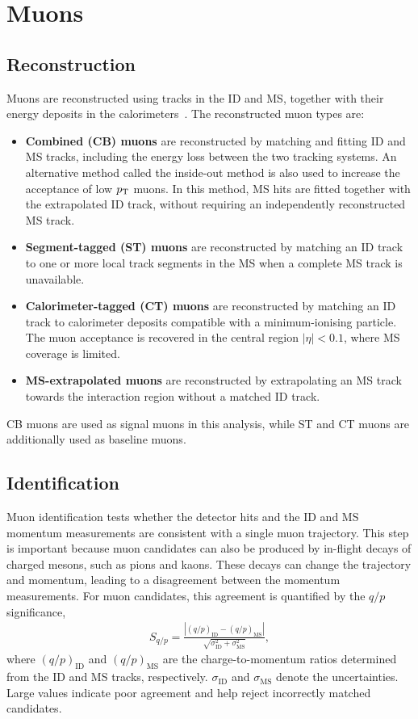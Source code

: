 \section{Muons}
\label{sec:ch6_muons}

\subsection{Reconstruction}

Muons are reconstructed using tracks in the ID and MS, together with their energy deposits in the calorimeters~\cite{ATLAS2021MuonID}.
The reconstructed muon types are:
\begin{itemize}
    \item \textbf{Combined (CB) muons} are reconstructed by matching and fitting ID and MS tracks, including the energy loss between the two tracking systems. An alternative method called the inside-out method is also used to increase the acceptance of low $p_{\mathrm{T}}$ muons. In this method, MS hits are fitted together with the extrapolated ID track, without requiring an independently reconstructed MS track.    
    \item \textbf{Segment-tagged (ST) muons} are reconstructed by matching an ID track to one or more local track segments in the MS when a complete MS track is unavailable.
    \item \textbf{Calorimeter-tagged (CT) muons} are reconstructed by matching an ID track to calorimeter deposits compatible with a minimum-ionising particle. The muon acceptance is recovered in the central region $|\eta|<0.1$, where MS coverage is limited.
    \item \textbf{MS-extrapolated muons} are reconstructed by extrapolating an MS track towards the interaction region without a matched ID track.
\end{itemize}

\noindent CB muons are used as signal muons in this analysis, while ST and CT muons are additionally used as baseline muons.


\subsection{Identification}

Muon identification tests whether the detector hits and the ID and MS momentum measurements are consistent with a single muon trajectory.
This step is important because muon candidates can also be produced by in-flight decays of charged mesons, such as pions and kaons.
These decays can change the trajectory and momentum, leading to a disagreement between the momentum measurements.
For muon candidates, this agreement is quantified by the $q/p$ significance,
\begin{align*}
    S_{q/p}=\frac{\left|(q/p)_{\mathrm{ID}}-(q/p)_{\mathrm{MS}}\right|}
    {\sqrt{\sigma_{\mathrm{ID}}^2+\sigma_{\mathrm{MS}}^2}},
\end{align*}
where $(q/p)_{\mathrm{ID}}$ and $(q/p)_{\mathrm{MS}}$ are the charge-to-momentum ratios determined from the ID and MS tracks, respectively.
$\sigma_{\mathrm{ID}}$ and $\sigma_{\mathrm{MS}}$ denote the uncertainties.
Large values indicate poor agreement and help reject incorrectly matched candidates.

